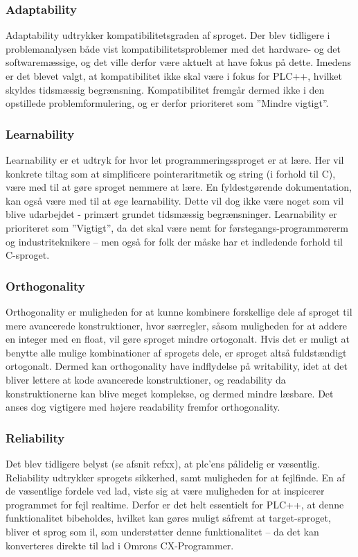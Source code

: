 \subsubsection{Adaptability} 
Adaptability udtrykker kompatibilitetsgraden af sproget. Der blev tidligere i problemanalysen både vist kompatibilitetsproblemer med det hardware- og det softwaremæssige, og det ville derfor være aktuelt at have fokus på dette. Imedens er det blevet valgt, at kompatibilitet ikke skal være i fokus for PLC++, hvilket skyldes tidsmæssig begrænsning. Kompatibilitet fremgår dermed ikke i den opstillede problemformulering, og er derfor prioriteret som ”Mindre vigtigt”.  

\subsubsection{Learnability} 
Learnability er et udtryk for hvor let programmeringssproget er at lære. Her vil konkrete tiltag som at simplificere pointeraritmetik og string (i forhold til C), være med til at gøre sproget nemmere at lære. En fyldestgørende dokumentation, kan også være med til at øge learnability. Dette vil dog ikke være noget som vil blive udarbejdet - primært grundet tidsmæssig begrænsninger. Learnability er prioriteret som ”Vigtigt”, da det skal være nemt for førstegangs-programmørerm og industriteknikere – men også for folk der måske har et indledende forhold til C-sproget.

\subsubsection{Orthogonality} 
Orthogonality er muligheden for at kunne kombinere forskellige dele af sproget til mere avancerede konstruktioner, hvor særregler, såsom muligheden for at addere en integer med en float, vil gøre sproget mindre ortogonalt. Hvis det er muligt at benytte alle mulige kombinationer af sprogets dele, er sproget altså fuldstændigt ortogonalt. Dermed kan orthogonality have indflydelse på writability, idet at det bliver lettere at kode avancerede konstruktioner, og readability da konstruktionerne kan blive meget komplekse, og dermed mindre læsbare. Det anses dog vigtigere med højere readability fremfor orthogonality.

\subsubsection{Reliability} 
Det blev tidligere belyst (se afsnit refxx), at \gls{plc}’ens pålidelig er væsentlig. Reliability udtrykker sprogets sikkerhed, samt muligheden for at fejlfinde. En af de væsentlige fordele ved \gls{lad}, viste sig at være muligheden for at inspicerer programmet for fejl realtime. Derfor er det helt essentielt for PLC++, at denne funktionalitet bibeholdes, hvilket kan gøres muligt såfremt at target-sproget, bliver et sprog som \gls{il}, som understøtter denne funktionalitet – da det kan konverteres direkte til \gls{lad} i Omrons CX-Programmer. 

